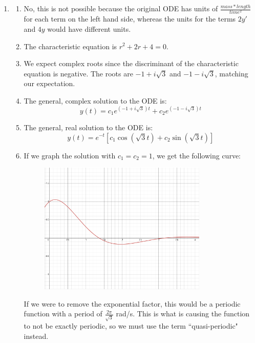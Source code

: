 

\begin{enumerate}
	\item 
    \begin{enumerate}
        \item No, this is not possible because the original ODE has units of $\frac{mass * length}{time^2}$ for each term on the left hand side, whereas the units for the terms $2y'$ and $4y$ would have different units.

        \item The characteristic equation is $r^2+2r+4 = 0$.

        \item We expect complex roots since the discriminant of the characteristic equation is negative. The roots are $-1+i\sqrt{3}$ and $-1-i\sqrt{3}$, matching our expectation.

        \item The general, complex solution to the ODE is:
        \[
        y(t) = c_1e^{(-1+i\sqrt{3})t} + c_2e^{(-1-i\sqrt{3})t}
        \]

        \item The general, real solution to the ODE is:
        \[
        y(t) = e^{-t}[c_1\cos(\sqrt{3}t)+c_2\sin{(\sqrt{3}t)}]
        \]

        \item If we graph the solution with $c_1=c_2=1$, we get the following curve:

        \begin{figure}[h]
        \includegraphics[width=8cm]{resources/Tut9_Q1.png}
        \centering
        \end{figure}

        If we were to remove the exponential factor, this would be a periodic function with a period of $\frac{2\pi}{\sqrt{3}}$ rad/s. This is what is causing the function to not be exactly periodic, so we must use the term ``quasi-periodic" instead.
    \end{enumerate}


\end{enumerate}
